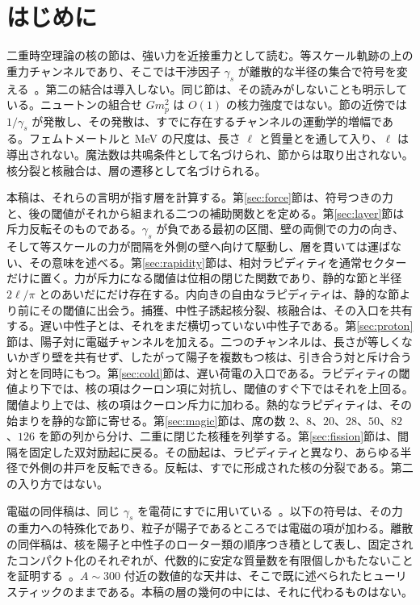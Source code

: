 \documentclass[a4paper]{article}
\begin{document}
\section{はじめに}
\label{sec:intro}

二重時空理論の核の節は、強い力を近接重力として読む。等スケール軌跡の上の重力チャンネルであり、そこでは干渉因子 \(\gamma_s\) が離散的な半径の集合で符号を変える~\cite{dst-main}。第二の結合は導入しない。同じ節は、その読みがしないことも明示している。ニュートンの組合せ \(G m_p^2\) は \(O(1)\) の核力強度ではない。節の近傍では \(1/\gamma_s\) が発散し、その発散は、すでに存在するチャンネルの運動学的増幅である。フェムトメートルと MeV の尺度は、長さ \(\ell\) と質量とを通して入り、\(\ell\) は導出されない。魔法数は共鳴条件として名づけられ、節からは取り出されない。核分裂と核融合は、層の遷移として名づけられる。

本稿は、それらの言明が指す層を計算する。第\ref{sec:force}節は、符号つきの力と、後の閾値がそれから組まれる二つの補助関数とを定める。第\ref{sec:layer}節は斥力反転そのものである。\(\gamma_s\) が負である最初の区間、壁の両側での力の向き、そして等スケールの力が間隔を外側の壁へ向けて駆動し、層を貫いては運ばない、その意味を述べる。第\ref{sec:rapidity}節は、相対ラピディティを通常セクターだけに置く。力が斥力になる閾値は位相の閉じた関数であり、静的な節と半径 \(2\ell/\pi\) とのあいだにだけ存在する。内向きの自由なラピディティは、静的な節より前にその閾値に出会う。捕獲、中性子誘起核分裂、核融合は、その入口を共有する。遅い中性子とは、それをまだ横切っていない中性子である。第\ref{sec:proton}節は、陽子対に電磁チャンネルを加える。二つのチャンネルは、長さが等しくないかぎり壁を共有せず、したがって陽子を複数もつ核は、引き合う対と斥け合う対とを同時にもつ。第\ref{sec:cold}節は、遅い荷電の入口である。ラピディティの閾値より下では、核の項はクーロン項に対抗し、閾値のすぐ下ではそれを上回る。閾値より上では、核の項はクーロン斥力に加わる。熱的なラピディティは、その始まりを静的な節に寄せる。第\ref{sec:magic}節は、席の数 \(2\)、\(8\)、\(20\)、\(28\)、\(50\)、\(82\)、\(126\) を節の列から分け、二重に閉じた核種を列挙する。第\ref{sec:fission}節は、間隔を固定した双対励起に戻る。その励起は、ラピディティと異なり、あらゆる半径で外側の井戸を反転できる。反転は、すでに形成された核の分裂である。第二の入り方ではない。

電磁の同伴稿は、同じ \(\gamma_s\) を電荷にすでに用いている~\cite{dst-shell}。以下の符号は、その力の重力への特殊化であり、粒子が陽子であるところでは電磁の項が加わる。離散の同伴稿は、核を陽子と中性子のローター類の順序つき積として表し、固定されたコンパクト化のそれぞれが、代数的に安定な質量数を有限個しかもたないことを証明する~\cite{dst-dio}。\(A\sim 300\) 付近の数値的な天井は、そこで既に述べられたヒューリスティックのままである。本稿の層の幾何の中には、それに代わるものはない。
\end{document}
